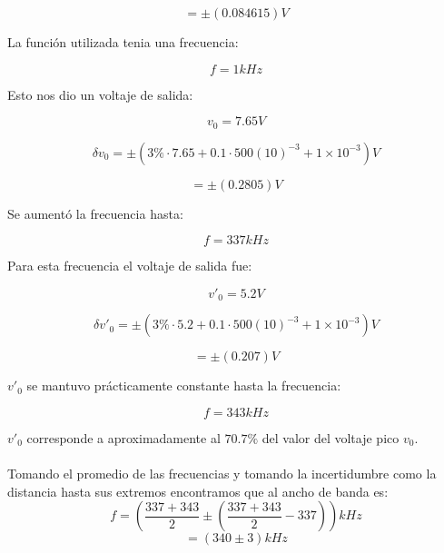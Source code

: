 \documentclass[DIV=calc, paper=a4, fontsize=11pt]{scrartcl}
\begin{document}
\begin{multicols}{2}
\begin{equation*}
    =\pm( 0.084615) V
\end{equation*}

La función utilizada tenia una frecuencia:

\begin{equation*}
    f= 1kHz
\end{equation*}

Esto nos dio un voltaje de salida:

\begin{equation*}
    v_{0} = 7.65 V
\end{equation*}

\begin{equation*}
    \delta v_{0}=\pm(3\%\cdot 7.65 + 0.1 \cdot 500 (10)^{-3} + 1\times10^{-3} ) V
\end{equation*}

\begin{equation*}
    =\pm( 0.2805) V
\end{equation*}

Se aumentó la frecuencia hasta:

\begin{equation*}
    f= 337 kHz
\end{equation*}

Para esta frecuencia el voltaje de salida fue:

\begin{equation*}
    v'_{0} = 5.2 V
\end{equation*}

\begin{equation*}
    \delta v'_{0}=\pm(3\%\cdot 5.2 + 0.1 \cdot 500 (10)^{-3} + 1\times10^{-3} ) V
\end{equation*}

\begin{equation*}
    =\pm( 0.207) V
\end{equation*}

$v'_{0}$ se mantuvo prácticamente constante hasta la frecuencia:

\begin{equation*}
    f= 343 kHz
\end{equation*}

$v'_{0}$ corresponde a aproximadamente al $70.7\%$ del valor del voltaje pico $v_{0}$.
\\\\
Tomando el promedio de las frecuencias y tomando la incertidumbre como la distancia hasta sus extremos encontramos que al ancho de banda es:
\begin{equation*}
    f= \left(\frac{337+343}{2}\pm \left(\frac{337+343}{2}-337\right) \right) kHz
\end{equation*}
\begin{equation*}
    = (340\pm3) kHz
\end{equation*}

\end{multicols}
\end{document}
